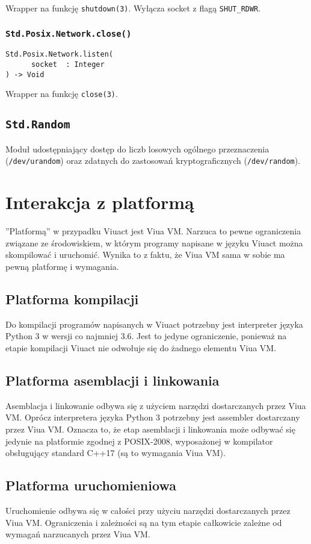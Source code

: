 Wrapper na funkcję \texttt{shutdown(3)}.
Wyłącza socket z flagą \texttt{SHUT\_RDWR}.

\subsubsection{\texttt{Std.Posix.Network.close()}}

\begin{small}
\begin{lstlisting}
Std.Posix.Network.listen(
      socket  : Integer
) -> Void
\end{lstlisting}
\end{small}

Wrapper na funkcję \texttt{close(3)}.


\subsection{\texttt{Std.Random}}
\label{stdlib_Std_Random}

Moduł udostępniający dostęp do liczb losowych ogólnego przeznaczenia (\texttt{/dev/urandom}) oraz zdatnych do
zastosowań kryptograficznych (\texttt{/dev/random}).

\section{Interakcja z platformą}

''Platformą'' w przypadku Viuact jest Viua VM. Narzuca to pewne ograniczenia związane ze środowiskiem, w
którym programy napisane w języku Viuact można skompilować i uruchomić. Wynika to z faktu, że Viua VM sama w
sobie ma pewną platformę i wymagania.

\subsection{Platforma kompilacji}

Do kompilacji programów napisanych w Viuact potrzebny jest interpreter języka Python 3 w wersji co najmniej
3.6. Jest to jedyne ograniczenie, ponieważ na etapie kompilacji Viuact nie odwołuje się do żadnego elementu
Viua VM.

\subsection{Platforma asemblacji i linkowania}

Asemblacja i linkowanie odbywa się z użyciem narzędzi dostarczanych przez Viua VM.
Oprócz interpretera języka Python 3 potrzebny jest assembler dostarczany przez Viua VM. Oznacza to, że etap
asemblacji i linkowania może odbywać się jedynie na platformie zgodnej z POSIX-2008, wyposażonej w kompilator
obsługujący standard C++17 (są to wymagania Viua VM).

\subsection{Platforma uruchomieniowa}

Uruchomienie odbywa się w całości przy użyciu narzędzi dostarczanych przez Viua VM.
Ograniczenia i zależności są na tym etapie całkowicie zależne od wymagań narzucanych przez Viua VM.

